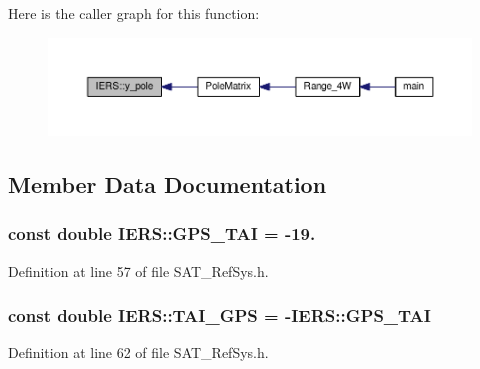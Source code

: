 Here is the caller graph for this function\-:\nopagebreak
\begin{figure}[H]
\begin{center}
\leavevmode
\includegraphics[width=350pt]{classIERS_a685869b1f1ac92c0595f8be01307a2ce_icgraph}
\end{center}
\end{figure}




\subsection{Member Data Documentation}
\hypertarget{classIERS_a6289aefd6f6c45e58d7d9ce2e3789c64}{
\subsubsection[{G\-P\-S\-\_\-\-T\-A\-I}]{\setlength{\rightskip}{0pt plus 5cm}const double I\-E\-R\-S\-::\-G\-P\-S\-\_\-\-T\-A\-I = -\/19.\hspace{0.3cm}{\ttfamily [static]}}}\label{classIERS_a6289aefd6f6c45e58d7d9ce2e3789c64}


Definition at line 57 of file S\-A\-T\-\_\-\-Ref\-Sys.\-h.

\hypertarget{classIERS_a7bf84e2e1ee0b01fcfcc4e6e2fe35355}{
\subsubsection[{T\-A\-I\-\_\-\-G\-P\-S}]{\setlength{\rightskip}{0pt plus 5cm}const double I\-E\-R\-S\-::\-T\-A\-I\-\_\-\-G\-P\-S = -\/{\bf I\-E\-R\-S\-::\-G\-P\-S\-\_\-\-T\-A\-I}\hspace{0.3cm}{\ttfamily [static]}}}\label{classIERS_a7bf84e2e1ee0b01fcfcc4e6e2fe35355}


Definition at line 62 of file S\-A\-T\-\_\-\-Ref\-Sys.\-h.

